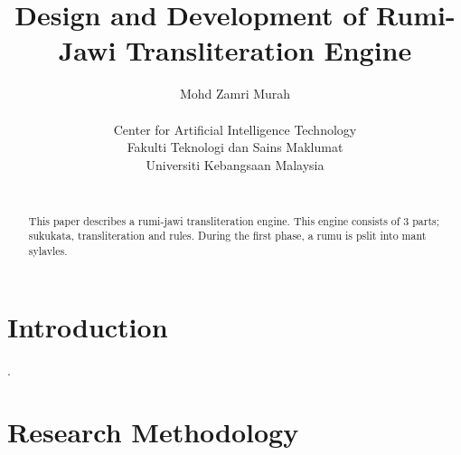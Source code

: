 \documentclass[a4paper]{IEEEconf}
\author{%
Mohd Zamri Murah\\
\begin{affiliation}
Center for Artificial Intelligence Technology\\
Fakulti Teknologi dan Sains Maklumat\\
Universiti Kebangsaan Malaysia
\end{affiliation} \\
\email{zamri@ftsm.ukm.my}
}
\title{Design and Development of Rumi-Jawi Transliteration Engine}
\begin{document}
\maketitle

\begin{abstract}
This paper describes a rumi-jawi transliteration engine. This engine consists of  3 parts; sukukata, transliteration and rules. During the first phase, a rumu is pslit into mant sylavles.
\end{abstract}

\section{Introduction}

\cite{Dugas2001}.

\section{Research Methodology}



\end{document}
